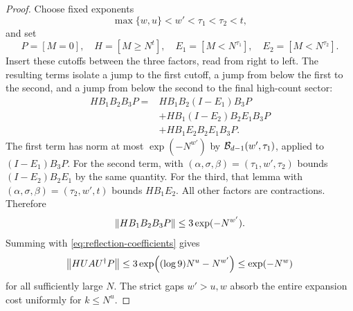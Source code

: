 \begin{proof}
Choose fixed exponents
\[
 \max\{w,u\}<w'<\tau_1<\tau_2<t,
\]
and set
\[
 P=[M=0],\quad H=[M\ge N^t],\quad
 E_1=[M<N^{\tau_1}],\quad E_2=[M<N^{\tau_2}].
\]
Insert these cutoffs between the three factors, read from right to left.
The resulting terms isolate a jump to the first cutoff, a jump from
below the first to the second, and a jump from below the second to
the final high-count sector:
\begin{align*}
 HB_1B_2B_3P
 ={}&HB_1B_2(I-E_1)B_3P\\
 &+HB_1(I-E_2)B_2E_1B_3P\\
 &+HB_1E_2B_2E_1B_3P.
\end{align*}
The first term has norm at most $\exp(-N^{w'})$ by
$\mathcal B_{d-1}(w',\tau_1)$, applied to $(I-E_1)B_3P$.
For the second term,  with
$(\alpha,\sigma,\beta)=(\tau_1,w',\tau_2)$ bounds
$(I-E_2)B_2E_1$ by the same quantity. For the third, that
lemma with $(\alpha,\sigma,\beta)=(\tau_2,w',t)$ bounds
$HB_1E_2$. All other factors are contractions. Therefore
\[
 \left\lVert HB_1B_2B_3P\right\rVert\le3\exp(-N^{w'}).
\]
Summing with \eqref{eq:reflection-coefficients} gives
\[
 \left\lVert HUAU^\dagger P\right\rVert
 \le3\exp\!\left((\log9)N^u-N^{w'}\right)
 \le\exp(-N^w)
\]
for all sufficiently large $N$. The strict gaps $w'>u,w$
absorb the entire expansion cost uniformly for $k\le N^u$.
\end{proof}
